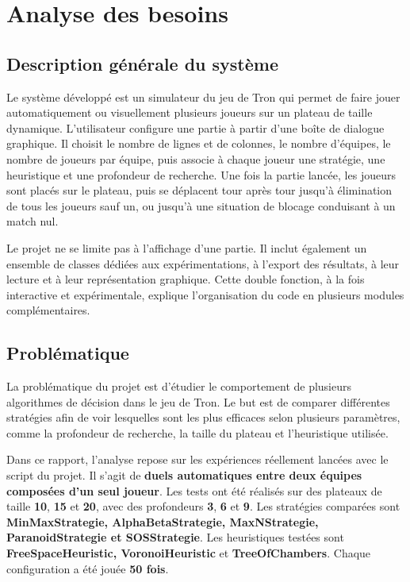 \documentclass[11pt,a4paper]{article}
\begin{document}
\section{Analyse des besoins}
\subsection{Description générale du système}

Le système développé est un simulateur du jeu de Tron qui permet de faire jouer automatiquement ou visuellement plusieurs joueurs sur un plateau de taille dynamique. L'utilisateur configure une partie à partir d'une boîte de dialogue graphique. Il choisit le nombre de lignes et de colonnes, le nombre d'équipes, le nombre de joueurs par équipe, puis associe à chaque joueur une stratégie, une heuristique et une profondeur de recherche. Une fois la partie lancée, les joueurs sont placés sur le plateau, puis se déplacent tour après tour jusqu'à élimination de tous les joueurs sauf un, ou jusqu'à une situation de blocage conduisant à un match nul.

Le projet ne se limite pas à l'affichage d'une partie. Il inclut également un ensemble de classes dédiées aux expérimentations, à l'export des résultats, à leur lecture et à leur représentation graphique. Cette double fonction, à la fois interactive et expérimentale, explique l'organisation du code en plusieurs modules complémentaires.

\subsection{Problématique}

La problématique du projet est d’étudier le comportement de plusieurs algorithmes de décision dans le jeu de Tron. Le but est de comparer différentes stratégies afin de voir lesquelles sont les plus efficaces selon plusieurs paramètres, comme la profondeur de recherche, la taille du plateau et l’heuristique utilisée.

Dans ce rapport, l’analyse repose sur les expériences réellement lancées avec le script du projet. Il s’agit de \textbf{duels automatiques entre deux équipes composées d’un seul joueur}. Les tests ont été réalisés sur des plateaux de taille \textbf{10}, \textbf{15} et \textbf{20}, avec des profondeurs \textbf{3}, \textbf{6} et \textbf{9}. Les stratégies comparées sont \textbf{MinMaxStrategie, AlphaBetaStrategie, MaxNStrategie, ParanoidStrategie et SOSStrategie}. Les heuristiques testées sont \textbf{FreeSpaceHeuristic, VoronoiHeuristic} et \textbf{TreeOfChambers}. Chaque configuration a été jouée \textbf{50 fois}.
\end{document}
